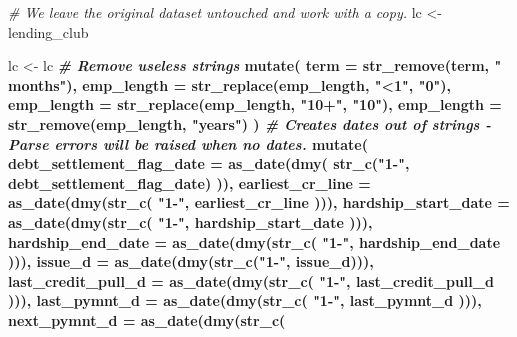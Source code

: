 \documentclass[11pt,]{report}
\newenvironment{Shaded}{\begin{snugshade}}{\end{snugshade}}
\newcommand{\CommentTok}[1]{\textcolor[rgb]{0.56,0.35,0.01}{\textit{#1}}}
\newcommand{\DataTypeTok}[1]{\textcolor[rgb]{0.13,0.29,0.53}{#1}}
\newcommand{\KeywordTok}[1]{\textcolor[rgb]{0.13,0.29,0.53}{\textbf{#1}}}
\newcommand{\NormalTok}[1]{#1}
\newcommand{\OperatorTok}[1]{\textcolor[rgb]{0.81,0.36,0.00}{\textbf{#1}}}
\newcommand{\StringTok}[1]{\textcolor[rgb]{0.31,0.60,0.02}{#1}}
\begin{document}
\begin{Shaded}
\begin{Highlighting}[numbers=left,,]
  \CommentTok{# We leave the original dataset untouched and work with a copy.}
\NormalTok{  lc <-}\StringTok{ }\NormalTok{lending_club}
  
\NormalTok{  lc <-}\StringTok{ }\NormalTok{lc }\OperatorTok{%
\StringTok{    }\CommentTok{# Remove useless strings}
\StringTok{    }\KeywordTok{mutate}\NormalTok{(}
      \DataTypeTok{term       =} \KeywordTok{str_remove}\NormalTok{(term, }\StringTok{" months"}\NormalTok{),}
      \DataTypeTok{emp_length =} \KeywordTok{str_replace}\NormalTok{(emp_length, }\StringTok{"<1"}\NormalTok{, }\StringTok{"0"}\NormalTok{),}
      \DataTypeTok{emp_length =} \KeywordTok{str_replace}\NormalTok{(emp_length, }\StringTok{"10+"}\NormalTok{, }\StringTok{"10"}\NormalTok{),}
      \DataTypeTok{emp_length =} \KeywordTok{str_remove}\NormalTok{(emp_length, }\StringTok{"years"}\NormalTok{)}
\NormalTok{    ) }\OperatorTok{%
\StringTok{    }
\StringTok{    }\CommentTok{# Creates dates out of strings - Parse errors will be raised when no dates.}
\StringTok{    }\KeywordTok{mutate}\NormalTok{(}
      \DataTypeTok{debt_settlement_flag_date =} \KeywordTok{as_date}\NormalTok{(}\KeywordTok{dmy}\NormalTok{(}
        \KeywordTok{str_c}\NormalTok{(}\StringTok{"1-"}\NormalTok{, debt_settlement_flag_date)}
\NormalTok{      )),}
      \DataTypeTok{earliest_cr_line          =} \KeywordTok{as_date}\NormalTok{(}\KeywordTok{dmy}\NormalTok{(}\KeywordTok{str_c}\NormalTok{(}
        \StringTok{"1-"}\NormalTok{, earliest_cr_line}
\NormalTok{      ))),}
      \DataTypeTok{hardship_start_date       =} \KeywordTok{as_date}\NormalTok{(}\KeywordTok{dmy}\NormalTok{(}\KeywordTok{str_c}\NormalTok{(}
        \StringTok{"1-"}\NormalTok{, hardship_start_date}
\NormalTok{      ))),}
      \DataTypeTok{hardship_end_date         =} \KeywordTok{as_date}\NormalTok{(}\KeywordTok{dmy}\NormalTok{(}\KeywordTok{str_c}\NormalTok{(}
        \StringTok{"1-"}\NormalTok{, hardship_end_date}
\NormalTok{      ))),}
      \DataTypeTok{issue_d                   =} \KeywordTok{as_date}\NormalTok{(}\KeywordTok{dmy}\NormalTok{(}\KeywordTok{str_c}\NormalTok{(}\StringTok{"1-"}\NormalTok{, issue_d))),}
      \DataTypeTok{last_credit_pull_d        =} \KeywordTok{as_date}\NormalTok{(}\KeywordTok{dmy}\NormalTok{(}\KeywordTok{str_c}\NormalTok{(}
        \StringTok{"1-"}\NormalTok{, last_credit_pull_d}
\NormalTok{      ))),}
      \DataTypeTok{last_pymnt_d              =} \KeywordTok{as_date}\NormalTok{(}\KeywordTok{dmy}\NormalTok{(}\KeywordTok{str_c}\NormalTok{(}
        \StringTok{"1-"}\NormalTok{, last_pymnt_d}
\NormalTok{      ))),}
      \DataTypeTok{next_pymnt_d              =} \KeywordTok{as_date}\NormalTok{(}\KeywordTok{dmy}\NormalTok{(}\KeywordTok{str_c}\NormalTok{(}
}}
\end{Highlighting}
\end{Shaded}
\end{document}

